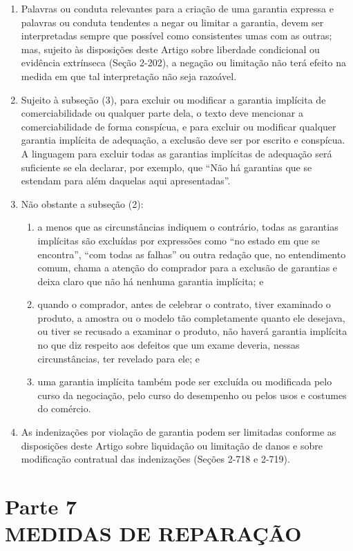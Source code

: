 \documentclass[a5paper,10pt]{book}
\begin{document}
\begin{enumerate}[label=(\arabic*)]
	\item Palavras ou conduta relevantes para a criação de uma garantia expressa e palavras ou conduta tendentes a negar ou limitar a garantia, devem ser interpretadas sempre que possível como consistentes umas com as outras; mas, sujeito às disposições deste Artigo sobre liberdade condicional ou evidência extrínseca (Seção 2-202), a negação ou limitação não terá efeito na medida em que tal interpretação não seja razoável.
	\item Sujeito à subseção (3), para excluir ou modificar a garantia implícita de comerciabilidade ou qualquer parte dela, o texto deve mencionar a comerciabilidade de forma conspícua, e para excluir ou modificar qualquer garantia implícita de adequação, a exclusão deve ser por escrito e conspícua. A linguagem para excluir todas as garantias implícitas de adequação será suficiente se ela declarar, por exemplo, que ``Não há garantias que se estendam para além daquelas aqui apresentadas''.
	\item Não obstante a subseção (2):
	\begin{enumerate}
		\item a menos que as circunstâncias indiquem o contrário, todas as garantias implícitas são excluídas por expressões como ``no estado em que se encontra'', ``com todas as falhas'' ou outra redação que, no entendimento comum, chama a atenção do comprador para a exclusão de garantias e deixa claro que não há nenhuma garantia implícita; e
		\item quando o comprador, antes de celebrar o contrato, tiver examinado o produto, a amostra ou o modelo tão completamente quanto ele desejava, ou tiver se recusado a examinar o produto, não haverá garantia implícita no que diz respeito aos defeitos que um exame deveria, nessas circunstâncias, ter revelado para ele; e
		\item uma garantia implícita também pode ser excluída ou modificada pelo curso da negociação, pelo curso do desempenho ou pelos usos e costumes do comércio.
	\end{enumerate}
	\item As indenizações por violação de garantia podem ser limitadas conforme as disposições deste Artigo sobre liquidação ou limitação de danos e sobre modificação contratual das indenizações (Seções 2-718 e 2-719).
\end{enumerate}

\chapter[Parte 7 -- MEDIDAS DE REPARAÇÃO]{Parte 7\\ MEDIDAS DE REPARAÇÃO}
\end{document}
